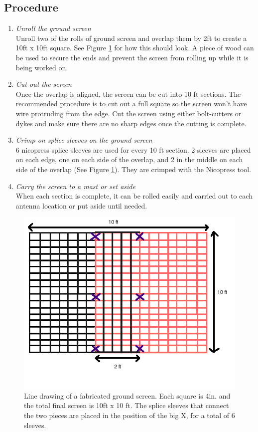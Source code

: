 \documentclass[12pt]{article}
\begin{document}
\begin{enumerate}
	\subsection{Procedure}
		\begin{enumerate}
			\item \emph{Unroll the ground screen} \\ Unroll two of the rolls of ground screen and overlap them by 2ft to create a 10ft x 10ft square. See Figure \ref{Grid} for how this should look. A piece of wood can be used to secure the ends and prevent the screen from rolling up while it is being worked on.
			\item \emph{Cut out the screen} \\ Once the overlap is aligned, the screen can be cut into 10 ft sections. The recommended procedure is to cut out a full square so the screen won't have wire protruding from the edge. Cut the screen using either bolt-cutters or dykes and make sure there are no sharp edges once the cutting is complete.
			\item \emph{Crimp on splice sleeves on the ground screen} \\ 6 nicopress splice sleeves are used for every 10 ft section. 2 sleeves are placed on each edge, one on each side of the overlap, and 2 in the middle on each side of the overlap (See Figure \ref{Grid}). They are crimped with the Nicopress tool.
			\item \emph{Carry the screen to a mast or set aside} \\ When each section is complete, it can be rolled easily and carried out to each antenna location or put aside until needed.
		\end{enumerate}
		
\begin{figure}[!h]
	\center
	\includegraphics[width=\linewidth]{GroundScreenGrid.png}
	\caption{Line drawing of a fabricated ground screen. Each square is 4in. and the total final screen is 10ft x 10 ft. The splice sleeves that connect the two pieces are placed in the position of the big X, for a total of 6 sleeves. \label{Grid}}
\end{figure}



\end{enumerate}
\end{document}
